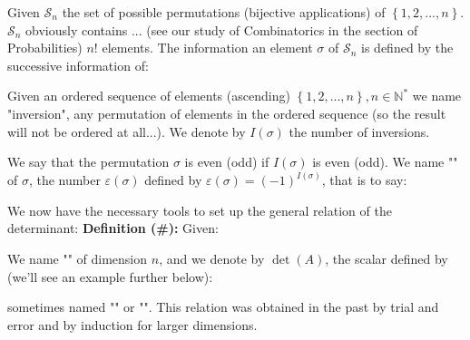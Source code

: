 	Given $\mathcal{S}_n$ the set of possible permutations (bijective applications) of $\left\lbrace 1,2,...,n\right\rbrace$.  $\mathcal{S}_n$ obviously contains ... (see our study of Combinatorics in the section of Probabilities) $n!$ elements. The information an element $\sigma$ of $\mathcal{S}_n$ is defined by the successive information of:
	
	Given an ordered sequence of elements (ascending) $\left\lbrace 1,2,...,n\right\rbrace,n \in \mathbb{N}^{*}$ we name "inversion", any permutation of elements in the ordered sequence (so the result will not be ordered at all...). We denote by $I(\sigma)$ the number of inversions.
	
	We say that the permutation $\sigma$ is even (odd) if $I(\sigma)$ is even (odd). We name "" of $\sigma$, the number $\varepsilon(\sigma)$ defined by $\varepsilon(\sigma)=(-1)^{I(\sigma)}$, that is to say:
	
	We now have the necessary tools to set up the general relation of the determinant:
	\textbf{Definition (\#\mydef):} Given:
	
	We name "" of dimension $n$, and we denote by $\det (A)$, the scalar defined by (we'll see an example further below):
	
	sometimes named "\label{leibniz formula}" or "". This relation was obtained in the past by trial and error and by induction for larger dimensions.
	
